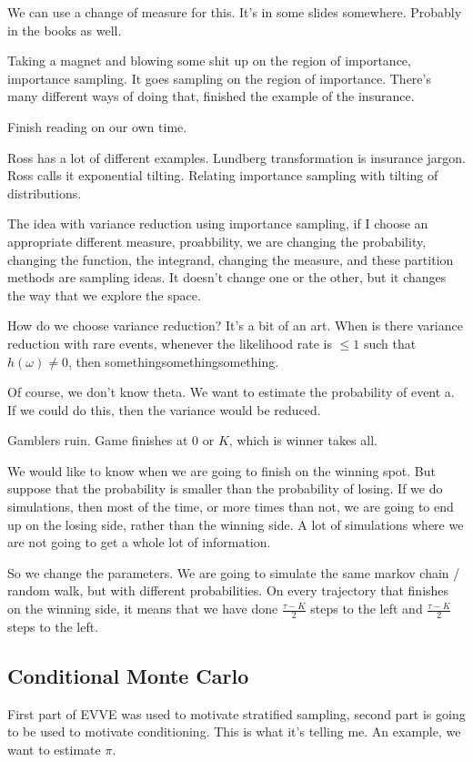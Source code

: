 \documentclass{article}
\begin{document}
We can use a change of measure for this. It's in some slides somewhere.
Probably in the books as well.

Taking a magnet and blowing some shit up on the region of importance,
importance sampling. It goes sampling on the region of importance.
There's many different ways of doing that, finished the example of the
insurance.

Finish reading on our own time.

Ross has a lot of different examples. Lundberg transformation is
insurance jargon. Ross calls it exponential tilting. Relating importance
sampling with tilting of distributions.

The idea with variance reduction using importance sampling, if I choose
an appropriate different measure, proabbility, we are changing the
probability, changing the function, the integrand, changing the
measure, and these partition methods are sampling ideas. It doesn't
change one or the other, but it changes the way that we explore the
space.

How do we choose variance reduction? It's a bit of an art. When is there
variance reduction with rare events, whenever the likelihood rate is
$\le 1$ such that $h(\omega) \ne 0$, then somethingsomethingsomething.

Of course, we don't know theta. We want to estimate the probability of
event a. If we could do this, then the variance would be reduced.

Gamblers ruin. Game finishes at 0 or $K$, which is winner takes all.

We would like to know when we are going to finish on the winning spot.
But suppose that the probability is smaller than the probability of
losing. If we do simulations, then most of the time, or more times than
not, we are going to end up on the losing side, rather than the winning
side. A lot of simulations where we are not going to get a whole lot of
information.

So we change the parameters. We are going to simulate the same markov
chain / random walk, but with different probabilities. On every
trajectory that finishes on the winning side, it means that we have done
$\frac{\tau - K}{2}$ steps to the left and $\frac{\tau - K}{2}$ steps to the
left.

\subsection{Conditional Monte Carlo}

First part of EVVE was used to motivate stratified sampling, second part
is going to be used to motivate conditioning. This is what it's telling
me. An example, we want to estimate $\pi$.
\end{document}
